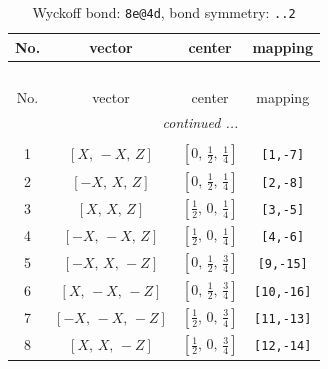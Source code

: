 \documentclass[fleqn,8pt]{jsarticle}
\begin{document}
\begin{longtable}{cccc}
\caption{Wyckoff bond: {\tt 8e@4d}, bond symmetry: {\tt ..2}}
 \\
 \hline \hline
No. & vector & center & mapping \\ \hline \endfirsthead

\multicolumn{3}{l}{\tablename\ \thetable{}} \\
 \hline \hline
No. & vector & center & mapping \\ \hline \endhead

 \hline \hline
\multicolumn{3}{r}{\footnotesize\it continued ...} \\ \endfoot

 \hline \hline
\multicolumn{3}{r}{} \\ \endlastfoot

1 & $\left[ X,\, - X,\, Z \right]$ & $\left[ 0,\, \frac{1}{2},\, \frac{1}{4} \right]$ & {\tt [1,-7]} \\ \hline
2 & $\left[ - X,\, X,\, Z \right]$ & $\left[ 0,\, \frac{1}{2},\, \frac{1}{4} \right]$ & {\tt [2,-8]} \\ \hline
3 & $\left[ X,\, X,\, Z \right]$ & $\left[ \frac{1}{2},\, 0,\, \frac{1}{4} \right]$ & {\tt [3,-5]} \\ \hline
4 & $\left[ - X,\, - X,\, Z \right]$ & $\left[ \frac{1}{2},\, 0,\, \frac{1}{4} \right]$ & {\tt [4,-6]} \\ \hline
5 & $\left[ - X,\, X,\, - Z \right]$ & $\left[ 0,\, \frac{1}{2},\, \frac{3}{4} \right]$ & {\tt [9,-15]} \\ \hline
6 & $\left[ X,\, - X,\, - Z \right]$ & $\left[ 0,\, \frac{1}{2},\, \frac{3}{4} \right]$ & {\tt [10,-16]} \\ \hline
7 & $\left[ - X,\, - X,\, - Z \right]$ & $\left[ \frac{1}{2},\, 0,\, \frac{3}{4} \right]$ & {\tt [11,-13]} \\ \hline
8 & $\left[ X,\, X,\, - Z \right]$ & $\left[ \frac{1}{2},\, 0,\, \frac{3}{4} \right]$ & {\tt [12,-14]} \\
\end{longtable}
\renewcommand{\arraystretch}{1.2}
\end{document}
